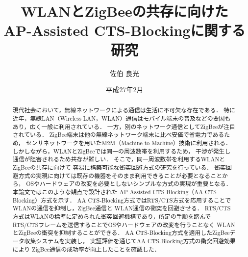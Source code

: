 \documentclass[12pt]{jreport}
\date{平成27年2月}
\title{WLANとZigBeeの共存に向けた\\AP-Assisted CTS-Blockingに関する研究}
\author{佐伯 良光}
\begin{document}
\maketitle

\begin{abstract}
現代社会において，無線ネットワークによる通信は生活に不可欠な存在である．
特に近年，無線LAN（Wireless LAN，WLAN）通信はモバイル端末の普及などの要因も
あり，広く一般に利用されている．
一方，別のネットワーク通信としてZigBeeが注目されている．
ZigBee端末は他の無線ネットワーク端末に比べ安価で省電力であるため，
センサネットワークを用いたM2M（Machine to Machine）技術に利用される．
しかしながら，WLANとZigBeeでは同一の周波数帯を利用するため，
干渉が発生し通信が阻害されるため共存が難しい．
そこで，同一周波数帯を利用するWLANとZigBeeの共存に向けて
容易に構築可能な衝突回避方式の研究を行っている．
衝突回避方式の実現に向けては既存の機器をそのまま利用できることが必要となることから，
OSやハードウェアの改変を必要としないシンプルな方式の実現が重要となる．
本論文ではこのような観点で設計された
AP-Assisted CTS-Blocking（AA CTS-Blocking）方式を示す．
AA CTS-Blocking方式ではRTS/CTS方式を応用することでWLANの通信を抑制し，ZigBee通信と
WLAN通信の衝突を回避させる．
RTS/CTS方式はWLANの標準に定められた衝突回避機構であり，所定の手順を踏んで
RTS/CTSフレームを送信することでOSやハードウェアの改変を行うことなく
WLANとZigBeeの衝突を抑制することができる．
AA CTS-Blocking方式を適用したZigBeeデータ収集システムを実装し，
実証評価を通じてAA CTS-Blocking方式の衝突回避効果により
ZigBee通信の成功率が向上したことを確認した．


\end{abstract}


\tableofcontents

\newpage

\end{document}
